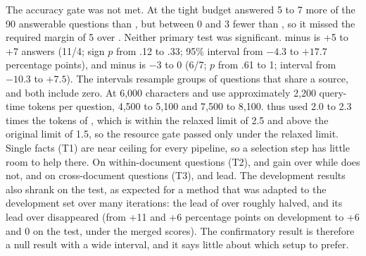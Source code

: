 The accuracy gate was not met. At the tight budget \lexb{} answered 5 to 7 more of the 90 answerable questions than \hybrid{}, but between 0 and 3 fewer than \hr{}, so it missed the required margin of 5 over \hr{}. Neither primary test was significant. %
\lexb{} minus \hybrid{} is +5 to +7 answers (11/4; sign $p$ from .12 to .33; 95\% interval from $-4.3$ to $+17.7$ percentage points), and \lexb{} minus \hr{} is $-3$ to 0 (6/7; $p$ from .61 to 1; interval from $-10.3$ to $+7.5$). The intervals resample groups of questions that share a source, and both include zero. %
At 6,000 characters \hybrid{} and \hr{} use approximately 2,200 query-time tokens per question, \lexb{} 4,500 to 5,100 and \setr{} 7,500 to 8,100. \lexb{} thus used 2.0 to 2.3 times the tokens of \hybrid{}, which is within the relaxed limit of 2.5 and above the original limit of 1.5, so the resource gate passed only under the relaxed limit. Single facts (T1) are near ceiling for every pipeline, so a selection step has little room to help there. On within-document questions (T2), \lexb{} and \hr{} gain over \hybrid{} while \setr{} does not, and on cross-document questions (T3), \hr{} and \setr{} lead. The development results also shrank on the test, as expected for a method that was adapted to the development set over many iterations: the lead of \lexb{} over \hybrid{} roughly halved, and its lead over \hr{} disappeared (from +11 and +6 percentage points on development to +6 and 0 on the test, under the merged scores). %
The confirmatory result is therefore a null result with a wide interval, and it says little about which setup to prefer.

